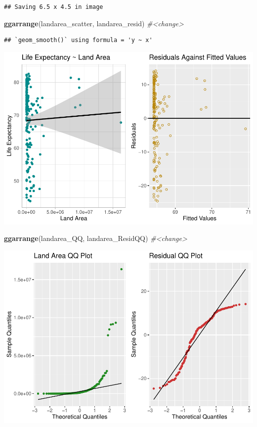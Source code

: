 \documentclass[
]{article}
\newenvironment{Shaded}{\begin{snugshade}}{\end{snugshade}}
\newcommand{\CommentTok}[1]{\textcolor[rgb]{0.56,0.35,0.01}{\textit{#1}}}
\newcommand{\FunctionTok}[1]{\textcolor[rgb]{0.13,0.29,0.53}{\textbf{#1}}}
\newcommand{\NormalTok}[1]{#1}
\begin{document}
\begin{verbatim}
## Saving 6.5 x 4.5 in image
\end{verbatim}

\begin{Shaded}
\begin{Highlighting}[]
\FunctionTok{ggarrange}\NormalTok{(landarea\_scatter, landarea\_resid) }\CommentTok{\#\textless{}change\textgreater{}}
\end{Highlighting}
\end{Shaded}

\begin{verbatim}
## `geom_smooth()` using formula = 'y ~ x'
\end{verbatim}

\includegraphics{STA108_TermProject_Jones-Chareonsuphiphat_files/figure-latex/unnamed-chunk-3-1.pdf}

\begin{Shaded}
\begin{Highlighting}[]
\FunctionTok{ggarrange}\NormalTok{(landarea\_QQ, landarea\_ResidQQ) }\CommentTok{\#\textless{}change\textgreater{}}
\end{Highlighting}
\end{Shaded}

\includegraphics{STA108_TermProject_Jones-Chareonsuphiphat_files/figure-latex/unnamed-chunk-3-2.pdf}
\end{document}
